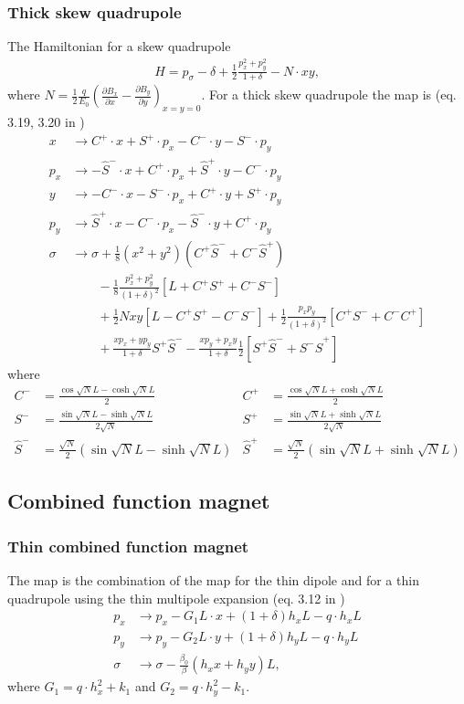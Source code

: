 \documentclass[english]{article}
\begin{document}
\subsubsection{Thick skew quadrupole}
The Hamiltonian for a skew quadrupole
\begin{align}
    H = p_\sigma-\delta+\frac{1}{2}\frac{p_x^2+p_y^2}{1+\delta}-N\cdot xy,
\end{align}
where $N=\frac{1}{2}\frac{q}{E_0}\left(\frac{\partial B_x}{\partial x} - 
\frac{\partial B_y}{\partial y}\right)_{x=y=0}$.
For a thick skew quadrupole the map is (eq. 3.19, 3.20 in \cite{ripken85})
\begin{align}
    x &\to C^+\cdot x+S^+\cdot p_x-C^-\cdot y-S^-\cdot p_y \\
    p_x &\to -\hat{S}^-\cdot x+C^+\cdot p_x+\hat{S}^+\cdot y-C^-\cdot p_y \\
    y &\to -C^-\cdot x-S^-\cdot p_x+C^+\cdot y+S^+\cdot p_y \\
    p_y &\to \hat{S}^+\cdot x -C^-\cdot p_x -\hat{S}^-\cdot y + C^+\cdot p_y \\
    \sigma &\to \sigma + \frac{1}{8}(x^2+y^2)\left(C^+\hat{S}^-+C^-\hat{S}^+\right) \\
    &\qquad-\frac{1}{8}\frac{p_x^2+p_y^2}{(1+\delta)^2}\left[L+C^+S^++C^-S^-\right] \\
    &\qquad+\frac{1}{2}Nxy\left[L-C^+S^+-C^-S^-\right] 
    +\frac{1}{2} \frac{p_xp_y}{(1+\delta)^2} \left[C^+S^-+C^-C^+\right] \\
    &\qquad+\frac{xp_x+yp_y}{1+\delta}S^+\hat{S}^--\frac{xp_y+p_xy}{1+\delta}\frac{1}{2}
    \left[S^+\hat{S}^-+S^-\hat{S}^+\right]
\end{align}
where 
\begin{align}
    C^-&=\frac{\cos\sqrt{N}L-\cosh\sqrt{N}L}{2} &
    C^+&=\frac{\cos\sqrt{N}L+\cosh\sqrt{N}L}{2} \\
    S^-&=\frac{\sin\sqrt{N}L-\sinh\sqrt{N}L}{2\sqrt{N}} &
    S^+&=\frac{\sin\sqrt{N}L+\sinh\sqrt{N}L}{2\sqrt{N}} \\
    \hat{S}^-&=\frac{\sqrt{N}}{2}(\sin\sqrt{N}L-\sinh\sqrt{N}L) &
    \hat{S}^+&=\frac{\sqrt{N}}{2}(\sin\sqrt{N}L+\sinh\sqrt{N}L)
\end{align}

\subsection{Combined function magnet}

\subsubsection{Thin combined function magnet}
The map is the combination of the map for the thin dipole and for a thin quadrupole using 
the thin multipole expansion (eq. 3.12 in \cite{ripken95})
\begin{align}
  p_x &\to p_x - G_1 L\cdot x + (1+\delta)h_x L - q\cdot h_xL \\
  p_y &\to p_y - G_2 L \cdot y +(1+\delta) h_y L - q\cdot h_yL\\
  \sigma &\to \sigma - \frac{\beta_0}{\beta}(h_xx+h_yy) L,
\end{align}
where $G_1=q \cdot h_x^2+k_1$ and $G_2=q \cdot h_y^2-k_1$.
\end{document}
